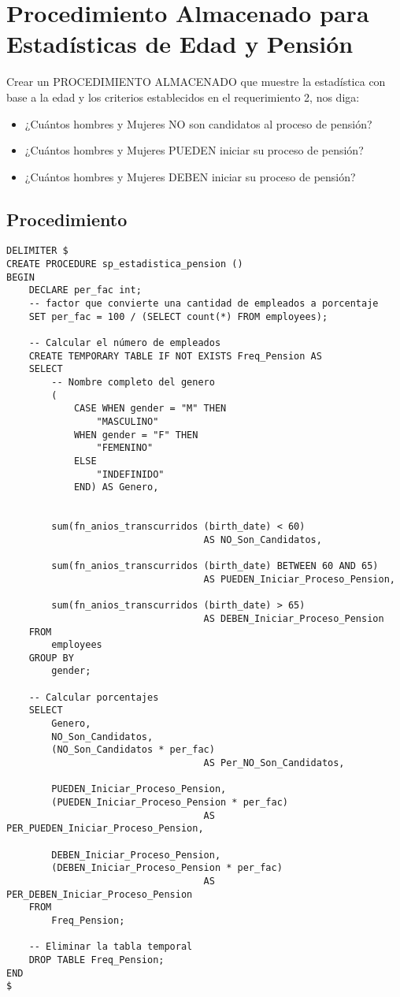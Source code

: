 \documentclass[11pt]{article}
\begin{document}
\section{Procedimiento Almacenado para Estadísticas de Edad y Pensión}
\label{sec:org7fbf290}
Crear un PROCEDIMIENTO ALMACENADO que muestre la estadística con base a la edad
y los criterios establecidos en el requerimiento 2, nos diga:

\begin{itemize}
\item ¿Cuántos hombres y Mujeres NO son candidatos al proceso de pensión?
\item ¿Cuántos hombres y Mujeres PUEDEN iniciar su proceso de pensión?
\item ¿Cuántos hombres y Mujeres DEBEN iniciar su proceso de pensión?
\end{itemize}

\subsection{Procedimiento}
\label{sec:orga28cc52}
\begin{verbatim}
DELIMITER $
CREATE PROCEDURE sp_estadistica_pension ()
BEGIN
    DECLARE per_fac int;
    -- factor que convierte una cantidad de empleados a porcentaje
    SET per_fac = 100 / (SELECT count(*) FROM employees);

    -- Calcular el número de empleados
    CREATE TEMPORARY TABLE IF NOT EXISTS Freq_Pension AS
    SELECT
        -- Nombre completo del genero
        (
            CASE WHEN gender = "M" THEN
                "MASCULINO"
            WHEN gender = "F" THEN
                "FEMENINO"
            ELSE
                "INDEFINIDO"
            END) AS Genero,


        sum(fn_anios_transcurridos (birth_date) < 60)
                                   AS NO_Son_Candidatos,

        sum(fn_anios_transcurridos (birth_date) BETWEEN 60 AND 65)
                                   AS PUEDEN_Iniciar_Proceso_Pension,

        sum(fn_anios_transcurridos (birth_date) > 65)
                                   AS DEBEN_Iniciar_Proceso_Pension
    FROM
        employees
    GROUP BY
        gender;

    -- Calcular porcentajes
    SELECT
        Genero,
        NO_Son_Candidatos,
        (NO_Son_Candidatos * per_fac)
                                   AS Per_NO_Son_Candidatos,

        PUEDEN_Iniciar_Proceso_Pension,
        (PUEDEN_Iniciar_Proceso_Pension * per_fac)
                                   AS PER_PUEDEN_Iniciar_Proceso_Pension,

        DEBEN_Iniciar_Proceso_Pension,
        (DEBEN_Iniciar_Proceso_Pension * per_fac)
                                   AS PER_DEBEN_Iniciar_Proceso_Pension
    FROM
        Freq_Pension;

    -- Eliminar la tabla temporal
    DROP TABLE Freq_Pension;
END
$
\end{verbatim}
\end{document}
